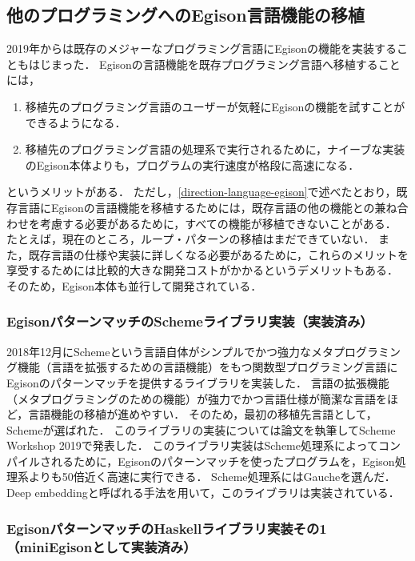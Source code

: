 \subsection{他のプログラミングへのEgison言語機能の移植}\label{direction-language-library}

2019年からは既存のメジャーなプログラミング言語にEgisonの機能を実装することもはじまった．
Egisonの言語機能を既存プログラミング言語へ移植することには，
\begin{enumerate}
\item 移植先のプログラミング言語のユーザーが気軽にEgisonの機能を試すことができるようになる．
\item 移植先のプログラミング言語の処理系で実行されるために，ナイーブな実装のEgison本体よりも，プログラムの実行速度が格段に高速になる．
\end{enumerate}
というメリットがある．
ただし，\ref{direction-language-egison}で述べたとおり，既存言語にEgisonの言語機能を移植するためには，既存言語の他の機能との兼ね合わせを考慮する必要があるために，すべての機能が移植できないことがある．
たとえば，現在のところ，ループ・パターンの移植はまだできていない．
また，既存言語の仕様や実装に詳しくなる必要があるために，これらのメリットを享受するためには比較的大きな開発コストがかかるというデメリットもある．
そのため，Egison本体も並行して開発されている．

\subsubsection{EgisonパターンマッチのSchemeライブラリ実装（実装済み）}\label{direction-language-scheme}

2018年12月にSchemeという言語自体がシンプルでかつ強力なメタプログラミング機能（言語を拡張するための言語機能）をもつ関数型プログラミング言語にEgisonのパターンマッチを提供するライブラリを実装した．
言語の拡張機能（メタプログラミングのための機能）が強力でかつ言語仕様が簡潔な言語をほど，言語機能の移植が進めやすい．
そのため，最初の移植先言語として，Schemeが選ばれた．
このライブラリの実装については論文を執筆してScheme Workshop 2019で発表した．
このライブラリ実装はScheme処理系によってコンパイルされるために，Egisonのパターンマッチを使ったプログラムを，Egison処理系よりも50倍近く高速に実行できる．
Scheme処理系にはGaucheを選んだ．
Deep embeddingと呼ばれる手法を用いて，このライブラリは実装されている．

\subsubsection{EgisonパターンマッチのHaskellライブラリ実装その1（miniEgisonとして実装済み）}\label{direction-language-haskell1}

